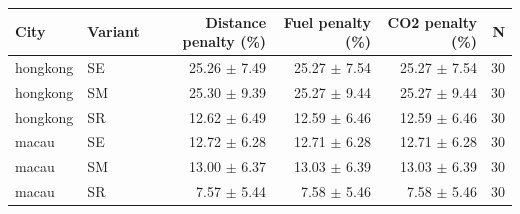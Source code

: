 \begin{tabular}{llrrr r}
\hline
City & Variant & Distance penalty (\%) & Fuel penalty (\%) & CO2 penalty (\%) & N \\
\hline
hongkong & SE & 25.26 $\pm$ 7.49 & 25.27 $\pm$ 7.54 & 25.27 $\pm$ 7.54 & 30 \\
hongkong & SM & 25.30 $\pm$ 9.39 & 25.27 $\pm$ 9.44 & 25.27 $\pm$ 9.44 & 30 \\
hongkong & SR & 12.62 $\pm$ 6.49 & 12.59 $\pm$ 6.46 & 12.59 $\pm$ 6.46 & 30 \\
macau & SE & 12.72 $\pm$ 6.28 & 12.71 $\pm$ 6.28 & 12.71 $\pm$ 6.28 & 30 \\
macau & SM & 13.00 $\pm$ 6.37 & 13.03 $\pm$ 6.39 & 13.03 $\pm$ 6.39 & 30 \\
macau & SR & 7.57 $\pm$ 5.44 & 7.58 $\pm$ 5.46 & 7.58 $\pm$ 5.46 & 30 \\
\hline
\end{tabular}
